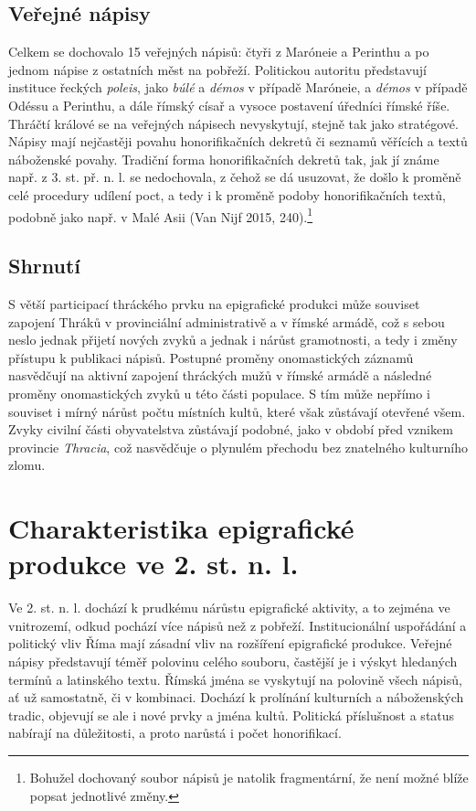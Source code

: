 \subsection[veřejné-nápisy-12]{Veřejné nápisy}

Celkem se dochovalo 15 veřejných nápisů: čtyři z Maróneie a Perinthu a po jednom nápise z ostatních měst na pobřeží. Politickou autoritu představují instituce řeckých {\em poleis}, jako {\em búlé} a {\em démos} v případě Maróneie, a {\em démos} v případě Odéssu a Perinthu, a dále římský císař a vysoce postavení úředníci římské říše. Thráčtí králové se na veřejných nápisech nevyskytují, stejně tak jako stratégové. Nápisy mají nejčastěji povahu honorifikačních dekretů či seznamů věřících a textů náboženské povahy. Tradiční forma honorifikačních dekretů tak, jak jí známe např. z 3. st. př. n. l. se nedochovala, z čehož se dá usuzovat, že došlo k proměně celé procedury udílení poct, a tedy i k proměně podoby honorifikačních textů, podobně jako např. v Malé Asii (Van Nijf 2015, 240).\footnote{Bohužel dochovaný soubor nápisů je natolik fragmentární, že není možné blíže popsat jednotlivé změny.}

\subsection[shrnutí-16]{Shrnutí}

S větší participací thráckého prvku na epigrafické produkci může souviset zapojení Thráků v provinciální administrativě a v římské armádě, což s sebou neslo jednak přijetí nových zvyků a jednak i nárůst gramotnosti, a tedy i změny přístupu k publikaci nápisů. Postupné proměny onomastických záznamů nasvědčují na aktivní zapojení thráckých mužů v římské armádě a následné proměny onomastických zvyků u této části populace. S tím může nepřímo i souviset i mírný nárůst počtu místních kultů, které však zůstávají otevřené všem. Zvyky civilní části obyvatelstva zůstávají podobné, jako v období před vznikem provincie {\em Thracia}, což nasvědčuje o plynulém přechodu bez znatelného kulturního zlomu.

\section[charakteristika-epigrafické-produkce-ve-2.-st.-n.-l.]{Charakteristika epigrafické produkce ve 2. st. n. l.}

Ve 2. st. n. l. dochází k prudkému nárůstu epigrafické aktivity, a to zejména ve vnitrozemí, odkud pochází více nápisů než z pobřeží. Institucionální uspořádání a politický vliv Říma mají zásadní vliv na rozšíření epigrafické produkce. Veřejné nápisy představují téměř polovinu celého souboru, častější je i výskyt hledaných termínů a latinského textu. Římská jména se vyskytují na polovině všech nápisů, ať už samostatně, či v kombinaci. Dochází k prolínání kulturních a náboženských tradic, objevují se ale i nové prvky a jména kultů. Politická příslušnost a status nabírají na důležitosti, a proto narůstá i počet honorifikací.


